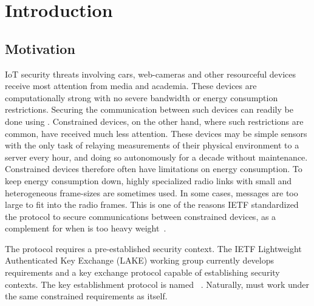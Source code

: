 \documentclass[runningheads]{llncs}
\begin{document}
\section{Introduction}
\label{sec:introduction}
\subsection{Motivation}
\label{sec:motivation}
IoT security threats involving cars, web-cameras and other resourceful devices
receive most attention from media and academia.
%
These devices are computationally strong with no severe bandwidth or energy
consumption restrictions.
%
Securing the communication between such devices can readily be done using
\mDandTls.
%
Constrained devices, on the other hand, where such restrictions are common,
have received much less attention.
%
These devices may be simple sensors with the only task of relaying
measurements of their physical environment to a server every hour, and doing so
autonomously for a decade without maintenance.
%
Constrained devices therefore often have limitations on energy consumption.
%
To keep energy consumption down, highly specialized radio links with small
and heterogeneous frame-sizes are sometimes used.
%
In some cases, \mDandTls messages are too large to fit into the radio frames.
%
This is one of the reasons IETF standardized the \mOscore protocol to secure
communications between constrained devices, as a complement for when \mDandTls
is too heavy weight~\cite{rfc8613}.
%

The \mOscore protocol requires a pre-established security context.
%
The IETF Lightweight Authenticated Key Exchange (LAKE) working group
currently develops requirements and a key exchange protocol capable of
establishing \mOscore security contexts.
%
The key establishment protocol is named \mEdhoc~\cite{selander-lake-edhoc-01}.
%
Naturally, \mEdhoc must work under the same constrained requirements as
\mOscore itself.
%
\end{document}
